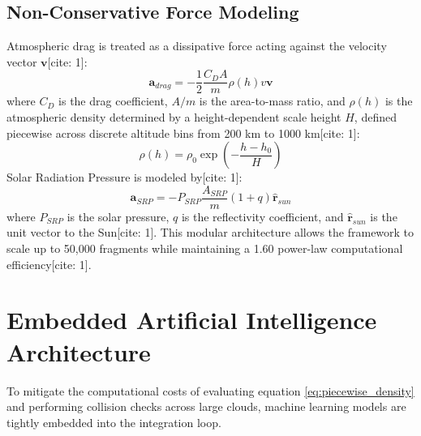 \documentclass[conf]{AAS} %
\begin{document}
\subsection{Non-Conservative Force Modeling}
Atmospheric drag is treated as a dissipative force acting against the velocity vector $\mathbf{v}$[cite: 1]:
\begin{equation}
    \mathbf{a}_{drag} = -\frac{1}{2}\frac{C_D A}{m}\rho(h)v\mathbf{v}
    \label{eq:analytical_drag}
\end{equation}
where $C_D$ is the drag coefficient, $A/m$ is the area-to-mass ratio, and $\rho(h)$ is the atmospheric density determined by a height-dependent scale height $H$, defined piecewise across discrete altitude bins from 200 km to 1000 km[cite: 1]:
\begin{equation}
    \rho(h) = \rho_0 \exp\left(-\frac{h - h_0}{H}\right)
    \label{eq:piecewise_density}
\end{equation}
Solar Radiation Pressure is modeled by[cite: 1]:
\begin{equation}
    \mathbf{a}_{SRP} = -P_{SRP}\frac{A_{SRP}}{m}(1+q)\hat{\mathbf{r}}_{sun}
    \label{eq:srp_equation}
\end{equation}
where $P_{SRP}$ is the solar pressure, $q$ is the reflectivity coefficient, and $\hat{\mathbf{r}}_{sun}$ is the unit vector to the Sun[cite: 1]. This modular architecture allows the framework to scale up to 50,000 fragments while maintaining a 1.60 power-law computational efficiency[cite: 1].

\section{Embedded Artificial Intelligence Architecture}
\label{sec:ai_architecture}

To mitigate the computational costs of evaluating equation \eqref{eq:piecewise_density} and performing collision checks across large clouds, machine learning models are tightly embedded into the integration loop.
\end{document}
